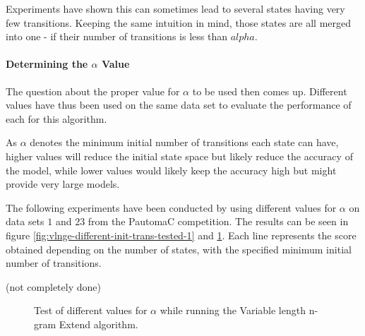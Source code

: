 Experiments have shown this can sometimes lead to several states having very few transitions. Keeping the same intuition in mind, those states are all merged into one - if their number of transitions is less than $alpha$.

\paragraph{Determining the $\alpha$ Value}

The question about the proper value for $\alpha$ to be used then comes up. Different values have thus been used on the same data set to evaluate the performance of each for this algorithm.

As $\alpha$ denotes the minimum initial number of transitions each state can have, higher values will reduce the initial state space but likely reduce the accuracy of the model, while lower values would likely keep the accuracy high but might provide very large models.

The following experiments have been conducted by using different values for $\alpha$ on data sets $1$ and $23$ from the PautomaC competition. The results can be seen in figure \ref{fig:vlnge-different-init-trans-tested-1} and \ref{fig:vlnge-different-init-trans-tested-23}. Each line represents the score obtained depending on the number of states, with the specified minimum initial number of transitions.

(not completely done)

\begin{figure}[!h]
\begin{centering}
\caption{Test of different values for $\alpha$ while running the Variable length n-gram Extend algorithm.}
\label{fig:vlnge-different-init-trans-tested-23} 
\end{centering}
\end{figure}

